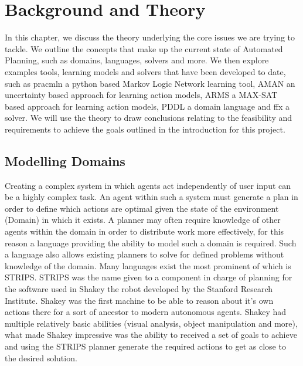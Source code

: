 \chapter{Background and Theory}
In this chapter, we discuss the theory underlying the core issues we are trying to tackle. We outline the concepts that make up the current state of Automated Planning, such as domains, languages, solvers and more. We then explore examples tools, learning models and solvers that have been developed to date, such as pracmln a python based Markov Logic Network learning tool, AMAN an uncertainty based approach for learning action models, ARMS a MAX-SAT based approach for learning action models, PDDL a domain language and ffx a solver. We will use the theory to draw conclusions relating to the feasibility and requirements to achieve the goals outlined in the introduction for this project.


\section{Modelling Domains}
Creating a complex system in which agents act independently of user input can be a highly complex task. An agent within such a system must generate a plan in order to define which actions are optimal given the state of the environment (Domain) in which it exists. A planner may often require knowledge of other agents within the domain in order to distribute work more effectively, for this reason a language providing the ability to model such a domain is required. Such a language also allows existing planners to solve for defined problems without knowledge of the domain. Many languages exist the most prominent of which is STRIPS. \newline
STRIPS was the name given to a component in charge of planning for the software used in Shakey the robot developed by the Stanford Research Institute. Shakey was the first machine to be able to reason about it's own actions there for a sort of ancestor to modern autonomous agents. Shakey had multiple relatively basic abilities (visual analysis, object manipulation and more), what made Shakey impressive was the ability to received a set of goals to achieve and using the STRIPS planner generate the required actions to get as close to the desired solution.
\newpage
